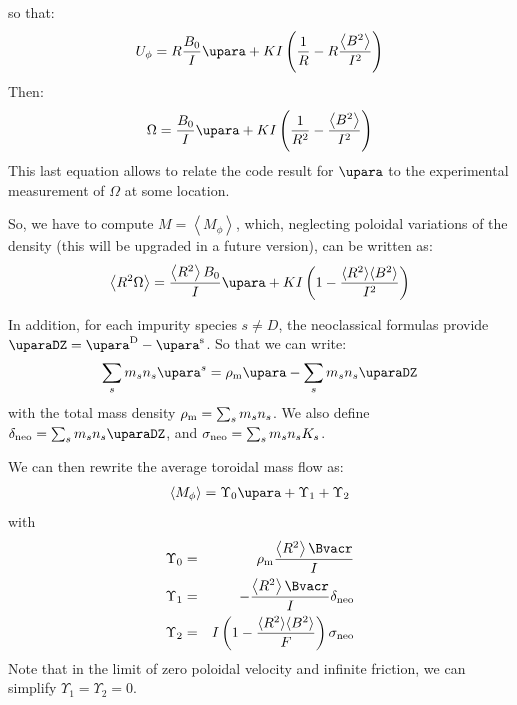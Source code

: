 so that:
\begin{eqnarray}
U_\phi = R \frac{B_0}{I}\upara + K I \left(\frac{1}{R}-R\frac{\left\langle B^2 \right\rangle}{I^2}\right)
\label{omegafromupar}
\end{eqnarray}
Then:
\begin{eqnarray}
\Omega =\frac{B_0}{I}\upara + K I \left(\frac{1}{R^2}-\frac{\left\langle B^2 \right\rangle}{I^2}\right)
\label{uparperp4}
\end{eqnarray}
This last equation allows to relate the code result for $\upara$ to the experimental measurement of $\Omega$ at some location.

So, we have to compute $M= \left\langle M_\phi \right\rangle$, which, neglecting poloidal variations of the density (this will be upgraded in a future version), can be written as:
\begin{eqnarray}
\left\langle R^2 \Omega \right\rangle = \frac{\left\langle R^2 \right\rangle B_0}{I}\upara+KI\left(1- \frac{\langle R^2  \rangle \langle B^2 \rangle }{I^2} \right)
\label{r2omupara}
\end{eqnarray}

In addition, for each impurity species $s\neq D$, the neoclassical formulas provide $\uparaDZ=\upara^{\rm D}-\upara^{\rm s}$.
So that we can write:
\begin{eqnarray}
\sum_s m_s n_s \upara^{s}=\rho_{\rm m} \upara-\sum_s m_s n_s \uparaDZ
\label{mphineoc}
\end{eqnarray}
with the total mass density $\rho_{\rm m}=\sum_s m_s n_s $. We also define $\delta_{\rm neo}=\sum_s m_s n_s \uparaDZ$, and $\sigma_{\rm neo}=\sum_s m_s n_s K_s$.

We can then rewrite the average toroidal mass flow as:
\begin{eqnarray}
\left\langle M_\phi \right\rangle=\Upsilon_0 \upara + \Upsilon_1 + \Upsilon_2
\label{mphiavupar}
\end{eqnarray}
with
\begin{eqnarray}
\Upsilon_0&=&\rho_{\rm m}\frac{\left\langle R^2 \right\rangle\Bvacr}{I}
\nonumber \\
\Upsilon_1&=&-\frac{\left\langle R^2 \right\rangle\Bvacr}{I}\delta_{\rm neo}
\nonumber \\
\Upsilon_2&=&I\left(1- \frac{\langle R^2  \rangle \langle B^2 \rangle }{F} \right)\sigma_{\rm neo}
\label{ABdefs}
\end{eqnarray}
Note that in the limit of zero poloidal velocity and infinite friction, we can simplify $\Upsilon_1=\Upsilon_2=0$.

